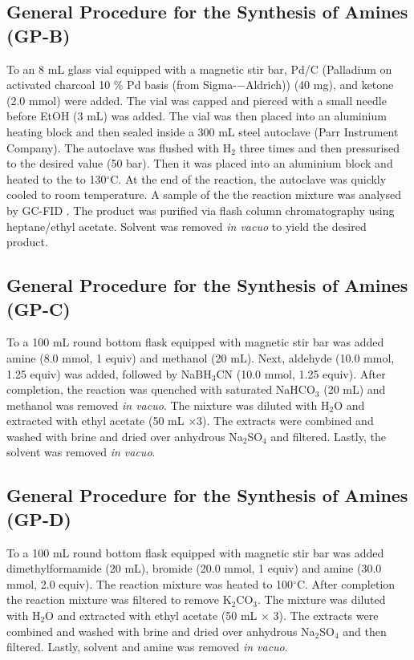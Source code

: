 \subsection{General Procedure for the Synthesis of Amines (GP-B)}

\label{ss:GPB}

To an 8 mL glass vial equipped with a magnetic stir bar, Pd/C (Palladium on activated charcoal 10 \% Pd basis (from Sigma-$-$Aldrich)) (40 mg), and ketone (2.0 mmol) were added. The vial was capped and pierced with a small needle before EtOH (3 mL) was added. The vial was then placed into an aluminium heating block and then sealed inside a 300 mL steel autoclave (Parr Instrument Company). The autoclave was flushed with H$_2$ three times and then pressurised to the desired value (50 bar). Then it was placed into an aluminium block and heated to the to 130$^{\circ}$C. At the end of the reaction, the autoclave was quickly cooled to room temperature. A sample of the the reaction mixture was analysed by GC-FID . The product was purified via flash column chromatography using heptane/ethyl acetate. Solvent was removed \textit{in vacuo} to yield the desired product.

\subsection{General Procedure for the Synthesis of Amines (GP-C)}

\label{ss:GPC}

To a 100 mL round bottom flask equipped with magnetic stir bar was added amine (8.0 mmol, 1 equiv) and methanol (20 mL). Next, aldehyde (10.0 mmol, 1.25 equiv) was added, followed by NaBH$_3$CN (10.0 mmol, 1.25 equiv). After completion, the reaction was quenched with saturated NaHCO$_3$ (20 mL) and methanol was removed \textit{in vacuo}. The mixture was diluted with H$_2$O and extracted with ethyl acetate (50 mL $\times$3). The extracts were combined and washed with brine and dried over anhydrous Na$_2$SO$_4$ and filtered. Lastly, the solvent was removed \textit{in vacuo}.

\subsection{General Procedure for the Synthesis of Amines (GP-D)}

\label{ss:GPD}

To a 100 mL round bottom flask equipped with magnetic stir bar was added dimethylformamide (20 mL), bromide (20.0 mmol, 1 equiv) and amine (30.0 mmol, 2.0 equiv). The reaction mixture was heated to 100$^{\circ}$C. After completion the reaction mixture was filtered to remove K$_2$CO$_3$. The mixture was diluted with H$_2$O and extracted with ethyl acetate (50 mL $\times$ 3). The extracts were combined and washed
with brine and dried over anhydrous Na$_2$SO$_4$ and then filtered. Lastly, solvent and amine was removed \textit{in vacuo}.

